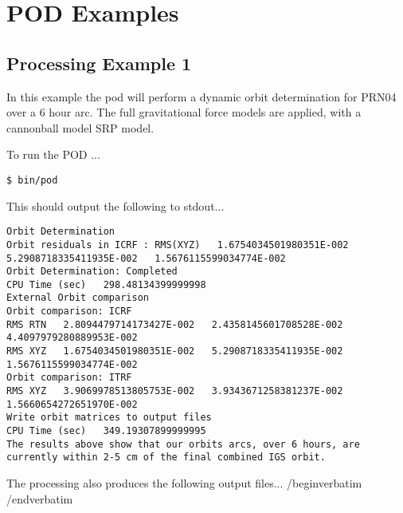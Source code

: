 \chapter{POD Examples}
\label{ch:pod_examples}

\section{Processing Example 1}
In this example the pod will perform a dynamic orbit determination for PRN04 over a 6 hour arc. 
The full gravitational force models are applied, with a cannonball model SRP model.

To run the POD ...
\begin{verbatim}
$ bin/pod
\end{verbatim}

This should output the following to stdout...
\begin{verbatim}
Orbit Determination
Orbit residuals in ICRF : RMS(XYZ)   1.6754034501980351E-002   5.2908718335411935E-002   1.5676115599034774E-002
Orbit Determination: Completed
CPU Time (sec)   298.48134399999998
External Orbit comparison
Orbit comparison: ICRF
RMS RTN   2.8094479714173427E-002   2.4358145601708528E-002   4.4097979280889953E-002
RMS XYZ   1.6754034501980351E-002   5.2908718335411935E-002   1.5676115599034774E-002
Orbit comparison: ITRF
RMS XYZ   3.9069978513805753E-002   3.9343671258381237E-002   1.5660654272651970E-002
Write orbit matrices to output files
CPU Time (sec)   349.19307899999995
The results above show that our orbits arcs, over 6 hours, are currently within 2-5 cm of the final combined IGS orbit.
\end{verbatim}

The processing also produces the following output files...
/begin{verbatim}
/end{verbatim}

